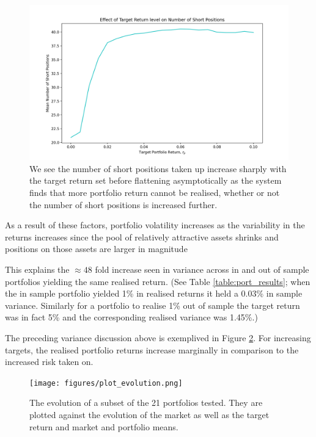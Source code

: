\documentclass{article}
\begin{document}
\begin{figure}[H]
	\centerline{\includegraphics[width=\textwidth]{figures/nShorts.png}}
	\caption{We see the number of short positions taken up increase sharply with the target return set before flattening asymptotically as the system finds that more portfolio return cannot be realised, whether or not the number of short positions is increased further.}
	\label{fig:nShorts}
\end{figure}


As a result of these factors, portfolio volatility increases as the variability in the returns increases since the pool of relatively attractive assets shrinks and positions on those assets are larger in magnitude

This explains the $\approx 48$ fold increase seen in variance across in and out of sample portfolios yielding the same realised return. (See Table \ref{table:port_results}; when the in sample portfolio yielded 1\% in realised returns it held a 0.03\% in sample variance. Similarly for a portfolio to realise 1\% out of sample the target return was in fact 5\% and the corresponding realised variance was 1.45\%.)



The preceding variance discussion above is exemplived in Figure \ref{fig:plot_evolution}. For increasing targets, the realised portfolio returns increase marginally in comparison to the increased risk taken on. 


\begin{figure}[H]
	\centerline{\texttt{[image: figures/plot\_evolution.png]}}
	\caption{The evolution of a subset of the 21 portfolios tested. They are plotted against the evolution of the market as well as the target return and market and portfolio means.}
	\label{fig:plot_evolution}
\end{figure}
\end{document}
